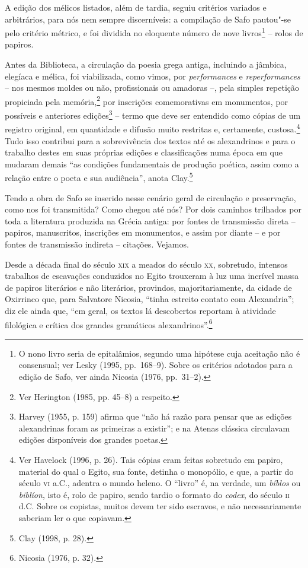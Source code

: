 A edição dos mélicos listados, além de tardia, seguiu critérios variados e
arbitrários, para nós nem sempre discerníveis: a compilação de Safo pautou"-se
pelo critério métrico, e foi dividida no eloquente número de nove
livros\footnote{ O nono livro seria de epitalâmios, segundo uma hipótese cuja
aceitação não é consensual; ver Lesky (1995, pp.~168--9). Sobre os critérios
adotados para a edição de Safo, ver ainda Nicosia (1976, pp.~31--2).}  -- rolos de papiros.

Antes da Biblioteca, a circulação da poesia grega antiga, incluindo a jâmbica,
elegíaca e mélica, foi viabilizada, como vimos, por \textit{performances} e
\textit{reperformances} -- nos mesmos moldes ou não, profissionais ou amadoras --, pela
simples repetição propiciada pela memória,\footnote{ Ver Herington (1985, pp.
45--8) a respeito.} por inscrições comemorativas em monumentos, por possíveis
e anteriores edições\footnote{ Harvey (1955, p. 159) afirma que “não há razão para pensar
que as edições alexandrinas foram as primeiras a existir”; e na Atenas clássica
circulavam edições disponíveis dos grandes poetas.} -- termo que deve ser
entendido como cópias de um registro original, em quantidade e difusão muito
restritas e, certamente, custosa.\footnote{ Ver Havelock (1996, p. 26). Tais
cópias eram feitas sobretudo em papiro, material do qual o Egito, sua fonte,
detinha o monopólio, e que, a partir do século \textsc{vi} a.C., adentra o mundo heleno.
O “livro” é, na verdade, um \textit{bíblos} ou \textit{biblíon}, isto é, rolo
de papiro, sendo tardio o formato do \textit{codex}, do século \textsc{ii} d.C. Sobre
os copistas, muitos devem ter sido escravos, e não necessariamente saberiam ler
o que copiavam.} Tudo isso contribui para a sobrevivência dos textos até os
alexandrinos e para o trabalho destes em suas próprias edições e classificações
numa época em que mudaram demais “as condições fundamentais de produção
poética, assim como a relação entre o poeta e sua audiência”, anota Clay.\footnote{ Clay (1998, p. 28).} 

Tendo a obra de Safo se inserido nesse cenário geral de circulação e
preservação, como nos foi transmitida? Como chegou até nós? Por dois caminhos
trilhados por toda a literatura produzida na Grécia antiga: por fontes de
transmissão direta -- papiros, manuscritos, inscrições em monumentos, e assim
por diante -- e por fontes de transmissão indireta -- citações. Vejamos. 

Desde a década final do século \textsc{xix} a meados do século \textsc{xx}, sobretudo,
intensos trabalhos de escavações conduzidos no Egito trouxeram à luz uma
incrível massa de papiros literários e não literários, provindos,
majoritariamente, da cidade de Oxirrinco que, para Salvatore Nicosia, “tinha
estreito contato com Alexandria”; diz ele ainda que, “em geral, os
textos lá descobertos reportam à atividade filológica e crítica dos grandes
gramáticos alexandrinos”.\footnote{ Nicosia (1976, p. 32).}

